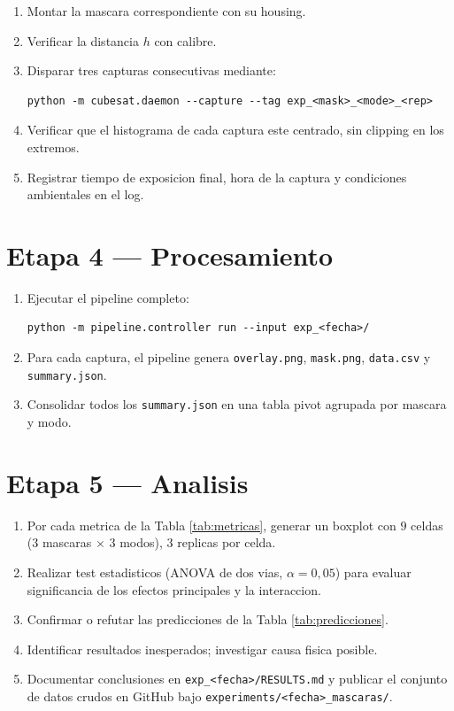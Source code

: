 \documentclass[11pt,a4paper,oneside]{report}
\begin{document}
\begin{enumerate}[leftmargin=2.2em]
  \item Montar la mascara correspondiente con su housing.
  \item Verificar la distancia $h$ con calibre.
  \item Disparar tres capturas consecutivas mediante:
\begin{verbatim}
python -m cubesat.daemon --capture --tag exp_<mask>_<mode>_<rep>
\end{verbatim}
  \item Verificar que el histograma de cada captura este centrado, sin
        clipping en los extremos.
  \item Registrar tiempo de exposicion final, hora de la captura y
        condiciones ambientales en el log.
\end{enumerate}

\section{Etapa 4 --- Procesamiento}

\begin{enumerate}[leftmargin=2.2em]
  \item Ejecutar el pipeline completo:
\begin{verbatim}
python -m pipeline.controller run --input exp_<fecha>/
\end{verbatim}
  \item Para cada captura, el pipeline genera \texttt{overlay.png},
        \texttt{mask.png}, \texttt{data.csv} y \texttt{summary.json}.
  \item Consolidar todos los \texttt{summary.json} en una tabla pivot
        agrupada por mascara y modo.
\end{enumerate}

\section{Etapa 5 --- Analisis}

\begin{enumerate}[leftmargin=2.2em]
  \item Por cada metrica de la Tabla \ref{tab:metricas}, generar un boxplot
        con $9$ celdas (3 mascaras $\times$ 3 modos), $3$ replicas por celda.
  \item Realizar test estadisticos (ANOVA de dos vias, $\alpha = 0{,}05$)
        para evaluar significancia de los efectos principales y la interaccion.
  \item Confirmar o refutar las predicciones de la Tabla \ref{tab:predicciones}.
  \item Identificar resultados inesperados; investigar causa fisica posible.
  \item Documentar conclusiones en \texttt{exp\_<fecha>/RESULTS.md} y
        publicar el conjunto de datos crudos en GitHub bajo
        \texttt{experiments/<fecha>\_mascaras/}.
\end{enumerate}
\end{document}
